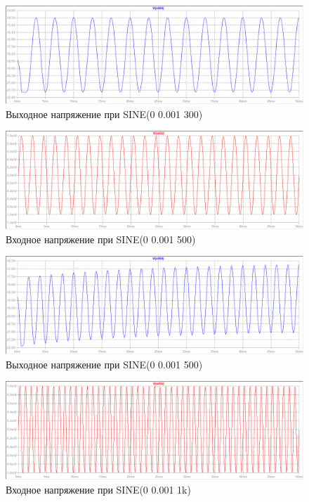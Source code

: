 \documentclass[a4paper, 12pt]{article}
\begin{document}
    \begin{figure}[H]
        \centering
        \includegraphics[scale=0.46]{3task_sine_out_1mV_300f.png}
        \captionsetup{skip=0pt}
        \caption{Выходное напряжение при SINE(0 0.001 300)}
        \label{fig:3task_sine_out_1mV_300f}
    \end{figure}
    \begin{figure}[H]
        \centering
        \includegraphics[scale=0.46]{3task_sine_in_1mV_500f.png}
        \captionsetup{skip=0pt}
        \caption{Входное напряжение при SINE(0 0.001 500)}
        \label{fig:3task_sine_in_1mV_500f}
    \end{figure}
    \begin{figure}[H]
        \centering
        \includegraphics[scale=0.46]{3task_sine_out_1mV_500f.png}
        \captionsetup{skip=0pt}
        \caption{Выходное напряжение при SINE(0 0.001 500)}
        \label{fig:3task_sine_out_1mV_500f}
    \end{figure}
    \begin{figure}[H]
        \centering
        \includegraphics[scale=0.46]{3task_sine_in_1mV_1kf.png}
        \captionsetup{skip=0pt}
        \caption{Входное напряжение при SINE(0 0.001 1k)}
        \label{fig:3task_sine_in_1mV_1kf}
    \end{figure}
\end{document}
